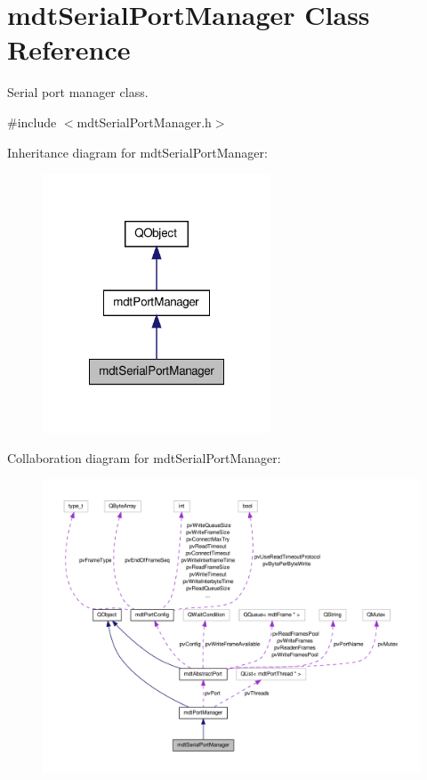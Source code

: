 \hypertarget{classmdt_serial_port_manager}{\section{mdt\-Serial\-Port\-Manager Class Reference}
\label{classmdt_serial_port_manager}
}


Serial port manager class.  




{\ttfamily \#include $<$mdt\-Serial\-Port\-Manager.\-h$>$}



Inheritance diagram for mdt\-Serial\-Port\-Manager\-:
\nopagebreak
\begin{figure}[H]
\begin{center}
\leavevmode
\includegraphics[width=192pt]{classmdt_serial_port_manager__inherit__graph}
\end{center}
\end{figure}


Collaboration diagram for mdt\-Serial\-Port\-Manager\-:
\nopagebreak
\begin{figure}[H]
\begin{center}
\leavevmode
\includegraphics[width=350pt]{classmdt_serial_port_manager__coll__graph}
\end{center}
\end{figure}
